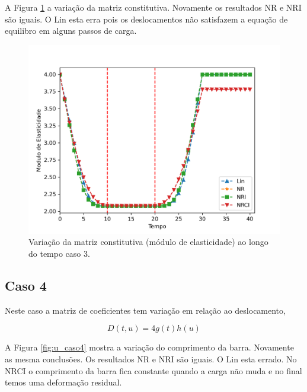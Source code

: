 \documentclass[12pt,a4paper]{article}
\begin{document}
A Figura \ref{fig:modE_caso3} a variação da matriz constitutiva. Novamente os resultados NR e NRI são iguais. O Lin esta erra pois os deslocamentos não satisfazem a equação de equilibro em alguns passos de carga.
\begin{figure}[H]
	\centering
	\includegraphics[width=1.0\textwidth]{caso3/modE_caso3.png}
	\caption{Variação da matriz constitutiva (módulo de elasticidade) ao longo do tempo caso 3.}
	\label{fig:modE_caso3}
\end{figure}


\subsection{Caso 4}

Neste caso a matriz de coeficientes tem variação em relação ao deslocamento,

\begin{equation}
D(t,u) = 4g(t)h(u)
\end{equation}

A Figura \ref{fig:u_caso4} mostra a variação do comprimento da barra. Novamente as mesma conclusões. Os resultados NR e NRI são iguais. O Lin esta errado. No NRCI o comprimento da barra fica constante quando a carga não muda e no final temos uma deformação residual.    
\end{document}
